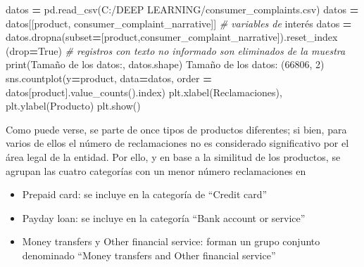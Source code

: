 \documentclass[
  a4paper,
  DIV=11,
  numbers=noendperiod]{scrreprt}
\newenvironment{Shaded}{\begin{snugshade}}{\end{snugshade}}
\newcommand{\BuiltInTok}[1]{#1}
\newcommand{\CommentTok}[1]{\textcolor[rgb]{0.56,0.35,0.01}{\textit{#1}}}
\newcommand{\DecValTok}[1]{\textcolor[rgb]{0.00,0.00,0.81}{#1}}
\newcommand{\NormalTok}[1]{#1}
\newcommand{\OperatorTok}[1]{\textcolor[rgb]{0.81,0.36,0.00}{\textbf{#1}}}
\newcommand{\StringTok}[1]{\textcolor[rgb]{0.31,0.60,0.02}{#1}}
\newcommand{\VariableTok}[1]{\textcolor[rgb]{0.00,0.00,0.00}{#1}}
\providecommand{\tightlist}{%
  \setlength{\itemsep}{0pt}\setlength{\parskip}{0pt}}\usepackage{longtable,booktabs,array}
\begin{document}
\begin{Shaded}
\begin{Highlighting}[numbers=left,,]
\NormalTok{datos }\OperatorTok{=}\NormalTok{ pd.read\_csv(}\StringTok{\textquotesingle{}C:/DEEP LEARNING/consumer\_complaints.csv\textquotesingle{}}\NormalTok{)}
\NormalTok{datos }\OperatorTok{=}\NormalTok{ datos[[}\StringTok{\textquotesingle{}product\textquotesingle{}}\NormalTok{, }\StringTok{\textquotesingle{}consumer\_complaint\_narrative\textquotesingle{}}\NormalTok{]] }\CommentTok{\# variables de}
\NormalTok{interés}
\NormalTok{datos }\OperatorTok{=}
\NormalTok{datos.dropna(subset}\OperatorTok{=}\NormalTok{[}\StringTok{\textquotesingle{}product\textquotesingle{}}\NormalTok{,}\StringTok{\textquotesingle{}consumer\_complaint\_narrative\textquotesingle{}}\NormalTok{]).reset\_index}
\NormalTok{(drop}\OperatorTok{=}\VariableTok{True}\NormalTok{) }\CommentTok{\# registros con texto no informado son eliminados de la muestra}
\BuiltInTok{print}\NormalTok{(}\StringTok{\textquotesingle{}Tamaño de los datos:\textquotesingle{}}\NormalTok{, datos.shape)}
\NormalTok{Tamaño de los datos: (}\DecValTok{66806}\NormalTok{, }\DecValTok{2}\NormalTok{)}
\NormalTok{sns.countplot(y}\OperatorTok{=}\StringTok{\textquotesingle{}product\textquotesingle{}}\NormalTok{, data}\OperatorTok{=}\NormalTok{datos, order }\OperatorTok{=}
\NormalTok{datos[}\StringTok{\textquotesingle{}product\textquotesingle{}}\NormalTok{].value\_counts().index)}
\NormalTok{plt.xlabel(}\StringTok{\textquotesingle{}Reclamaciones\textquotesingle{}}\NormalTok{), plt.ylabel(}\StringTok{\textquotesingle{}Producto\textquotesingle{}}\NormalTok{)}
\NormalTok{plt.show()}
\end{Highlighting}
\end{Shaded}

Como puede verse, se parte de once tipos de productos diferentes; si
bien, para varios de ellos el número de reclamaciones no es considerado
significativo por el área legal de la entidad. Por ello, y en base a la
similitud de los productos, se agrupan las cuatro categorías con un
menor número reclamaciones en

\begin{itemize}
\tightlist
\item
  Prepaid card: se incluye en la categoría de ``Credit card''
\item
  Payday loan: se incluye en la categoría ``Bank account or service''
\item
  Money transfers y Other financial service: forman un grupo conjunto
  denominado ``Money transfers and Other financial service''
\end{itemize}
\end{document}
